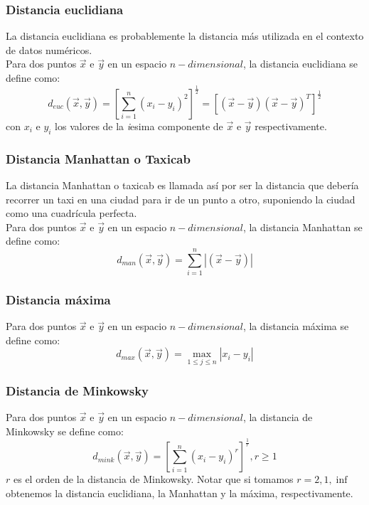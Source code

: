 \subsubsection{Distancia euclidiana}
La distancia euclidiana es probablemente la distancia más utilizada en el contexto de datos numéricos.\\
Para dos puntos $\vec{x}$ e $\vec{y}$ en un espacio $n-dimensional$, la distancia euclidiana se define como:
\begin{equation}
	d_{euc}(\vec{x}, \vec{y}) = [\sum\limits_{i=1}^n (x_i-y_i)^2]^\frac{1}{2} = [(\vec{x}-\vec{y})(\vec{x}-\vec{y})^T]^\frac{1}{2}
\end{equation}
con $x_i$ e $y_i$ los valores de la \textit{i}esima componente de $\vec{x}$ e $\vec{y}$ respectivamente.

\subsubsection{Distancia Manhattan o Taxicab}
La distancia Manhattan o taxicab es llamada así por ser la distancia que debería recorrer un taxi en una ciudad para ir de un punto a otro, suponiendo la ciudad como una cuadrícula perfecta.\\
Para dos puntos $\vec{x}$ e $\vec{y}$ en un espacio $n-dimensional$, la distancia Manhattan se define como:
\begin{equation}
	d_{man}(\vec{x}, \vec{y}) = \sum\limits_{i=1}^n |(\vec{x}-\vec{y})|
\end{equation}
\subsubsection{Distancia máxima}
Para dos puntos $\vec{x}$ e $\vec{y}$ en un espacio $n-dimensional$, la distancia máxima se define como:
\begin{equation}
	d_{max}(\vec{x}, \vec{y}) = \max_{1 \leq j \leq n} |x_i-y_i|
\end{equation}
\subsubsection{Distancia de Minkowsky}
Para dos puntos $\vec{x}$ e $\vec{y}$ en un espacio $n-dimensional$, la distancia de Minkowsky se define como:
\begin{equation}
	d_{mink}(\vec{x}, \vec{y}) = [\sum\limits_{i=1}^n (x_i-y_i)^r]^\frac{1}{r}, r \geq 1
\end{equation}
$r$ es el orden de la distancia de Minkowsky. Notar que si tomamos $r = 2,1,\inf$ obtenemos la distancia euclidiana, la Manhattan y la máxima, respectivamente.
